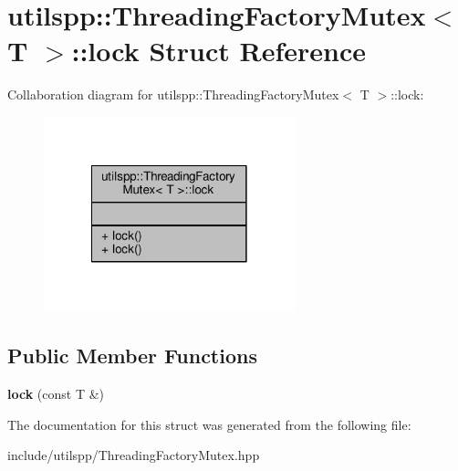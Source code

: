 \hypertarget{structutilspp_1_1ThreadingFactoryMutex_1_1lock}{\section{utilspp\-:\-:Threading\-Factory\-Mutex$<$ T $>$\-:\-:lock Struct Reference}
\label{structutilspp_1_1ThreadingFactoryMutex_1_1lock}
}


Collaboration diagram for utilspp\-:\-:Threading\-Factory\-Mutex$<$ T $>$\-:\-:lock\-:\nopagebreak
\begin{figure}[H]
\begin{center}
\leavevmode
\includegraphics[width=206pt]{structutilspp_1_1ThreadingFactoryMutex_1_1lock__coll__graph}
\end{center}
\end{figure}
\subsection*{Public Member Functions}
\begin{DoxyCompactItemize}
\item 
\hypertarget{structutilspp_1_1ThreadingFactoryMutex_1_1lock_a49402934851bb021ed42e15af18d6786}{{\bfseries lock} (const T \&)}\label{structutilspp_1_1ThreadingFactoryMutex_1_1lock_a49402934851bb021ed42e15af18d6786}

\end{DoxyCompactItemize}


The documentation for this struct was generated from the following file\-:\begin{DoxyCompactItemize}
\item 
include/utilspp/Threading\-Factory\-Mutex.\-hpp\end{DoxyCompactItemize}
